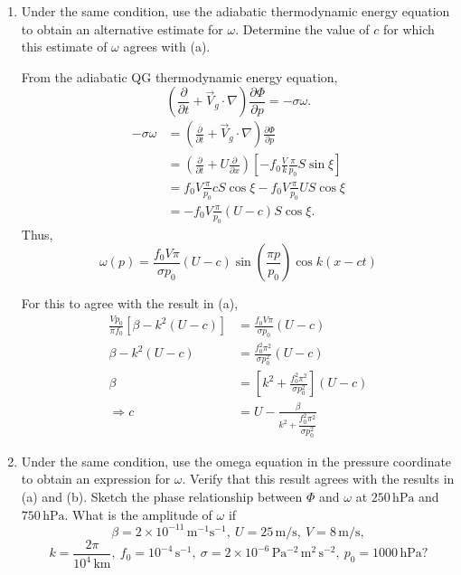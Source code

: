 \documentclass[11pt,a4paper]{article}
\begin{document}
{\begin{enumerate}[label=(\alph*)]
    \item Under the same condition, use the adiabatic thermodynamic energy equation to obtain an alternative estimate for $\omega$. Determine the value of $c$ for which this estimate of $\omega$ agrees with (a).
\begin{solution}
From the adiabatic QG thermodynamic energy equation,
\[
    \left(\frac{\partial}{\partial t}+\vec{V}_g\cdot\nabla\right)
    \frac{\partial \Phi}{\partial p}
    =
    -\sigma\omega .
\]
\begin{align*}
    -\sigma\omega
    &=
    \left(\frac{\partial}{\partial t}
    +\vec{V}_g\cdot\nabla\right)
    \frac{\partial \Phi}{\partial p} \\
    &=
    \left(\frac{\partial}{\partial t}
    +U\frac{\partial}{\partial x}\right)
    \left[
    -f_0\frac{V}{k}\frac{\pi}{p_0}S\sin\xi
    \right] \\
    &=
    f_0V\frac{\pi}{p_0}cS\cos\xi
    -
    f_0V\frac{\pi}{p_0}US\cos\xi \\
    &=
    -f_0V\frac{\pi}{p_0}(U-c)S\cos\xi.
\end{align*}
Thus,
\[
    \omega(p)
    =
    \frac{f_0V\pi}{\sigma p_0}
    (U-c)
    \sin\left(\frac{\pi p}{p_0}\right)
    \cos k(x-ct)
\]

For this to agree with the result in (a),
\begin{align*}
    \frac{Vp_0}{\pi f_0}
    \left[\beta-k^2(U-c)\right]
    &=
    \frac{f_0V\pi}{\sigma p_0}(U-c) \\
    \beta-k^2(U-c)
    &=
    \frac{f_0^2\pi^2}{\sigma p_0^2}(U-c) \\
    \beta
    &=
    \left[
    k^2+\frac{f_0^2\pi^2}{\sigma p_0^2}
    \right](U-c)\\
    \Rightarrow     c
    &=
    U
    -
    \frac{\beta}
    {k^2+\dfrac{f_0^2\pi^2}{\sigma p_0^2}}
\end{align*}
\end{solution}

    \item Under the same condition, use the omega equation in the pressure coordinate to obtain an expression for $\omega$. Verify that this result agrees with the results in (a) and (b). Sketch the phase relationship between $\Phi$ and $\omega$ at $250\,\mathrm{hPa}$ and $750\,\mathrm{hPa}$. What is the amplitude of $\omega$ if
    \[
        \beta = 2\times 10^{-11}\,\mathrm{m^{-1}s^{-1}},\ U = 25\,\mathrm{m/s},\ V = 8\,\mathrm{m/s},
    \]
    \[
        k = \frac{2\pi}{10^4\,\mathrm{km}},\ f_0 = 10^{-4}\,\mathrm{s^{-1}},\ \sigma = 2\times 10^{-6}\,\mathrm{Pa^{-2}\,m^{2}\,s^{-2}},\ p_0 = 1000\,\mathrm{hPa}?
    \]


\end{enumerate}}
\end{document}
